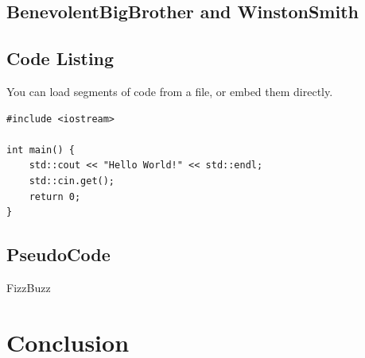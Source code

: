 \documentclass[10pt, a4paper]{article}
\begin{document}
	\subsection{BenevolentBigBrother and WinstonSmith}
	
	\subsection{Code Listing}
    You can load segments of code from a file, or embed them directly.
    
\begin{lstlisting}[caption = Hello World! in c++]
#include <iostream>

int main() {
    std::cout << "Hello World!" << std::endl;
    std::cin.get();
    return 0;
}
\end{lstlisting}
    
\subsection{PseudoCode}

\begin{algorithm}[h]
\caption{FizzBuzz}
\end{algorithm}
	
\section{Conclusion}	


\end{document}
